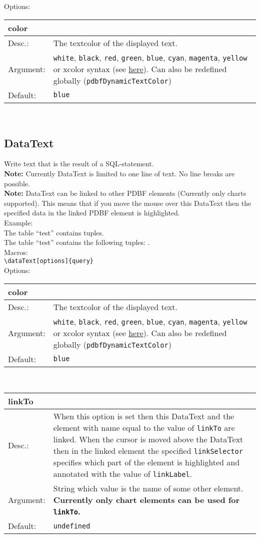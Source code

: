 \documentclass[11pt]{article}
\def\a{5cm}
\def\b{11.2cm}
\def\option#1#2#3#4{%
\noindent \begin{tabular}{|p{\a}|p{\b}|}
\hline
\textbf{#1} & \\
\hline
Desc.: & #2 \\
\hline
Argument: & #3\\
\hline
Default:& #4\\
\hline
\end{tabular} \\[4pt]%
}
\begin{document}
\noindent Options: \\[3pt]

\option
{color}
{The textcolor of the displayed text.}
{\texttt{white}, \texttt{black}, \texttt{red}, \texttt{green}, \texttt{blue}, \texttt{cyan}, \texttt{magenta}, \texttt{yellow} or xcolor syntax (see \href{http://mirror.unicorncloud.org/CTAN/macros/latex/contrib/xcolor/xcolor.pdf}{here}). Can also be redefined globally (\texttt{pdbfDynamicTextColor})}
{\texttt{blue}}

\subsection{DataText}
Write text that is the result of a SQL-statement.\\
\textbf{Note:} Currently DataText is limited to one line of text. No line breaks are possible.\\
\textbf{Note:} DataText can be linked to other PDBF elements (Currently only charts supported). This means that if you move the mouse over this DataText then the specified data in the linked PDBF element is highlighted.\\[3pt]
Example:\\[3pt]
The table ``test'' contains  tuples.\\
The table ``test'' contains the following tuples: .\\[3pt]
%
\noindent Macros: \\[3pt]
\verb|\dataText[options]{query}| \\[8pt]

\noindent Options: \\[3pt]

\option
{color}
{The textcolor of the displayed text.}
{\texttt{white}, \texttt{black}, \texttt{red}, \texttt{green}, \texttt{blue}, \texttt{cyan}, \texttt{magenta}, \texttt{yellow} or xcolor syntax (see \href{http://mirror.unicorncloud.org/CTAN/macros/latex/contrib/xcolor/xcolor.pdf}{here}). Can also be redefined globally (\texttt{pdbfDynamicTextColor})}
{\texttt{blue}}

\option
{linkTo}
{When this option is set then this DataText and the element with name equal to the value of \texttt{linkTo} are linked. When the cursor is moved above the DataText then in the linked element the specified \texttt{linkSelector} specifies which part of the element is highlighted and annotated with the value of \texttt{linkLabel}.}
{String which value is the name of some other element. \textbf{Currently only chart elements can be used for \texttt{linkTo}.}}
{\texttt{undefined}}
\end{document}
